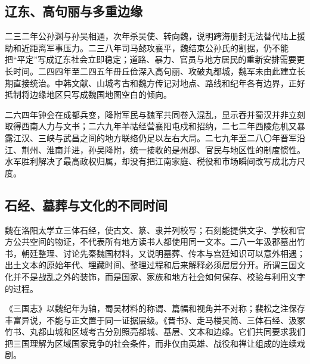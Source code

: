 \subsection{辽东、高句丽与多重边缘}

二三二年公孙渊与孙吴相通，次年杀吴使、转向魏，说明跨海册封无法替代陆上援助和近距离军事压力。二三八年司马懿攻襄平，魏结束公孙氏的割据，仍不能把“平定”写成辽东社会立即稳定；道路、暴力、官员与地方居民的重新安排需要更长时间。二四四年至二四五年毌丘俭深入高句丽、攻破丸都城，魏军未由此建立长期直接统治。中韩文献、山城考古和魏方传记对地点、路线和纪年各有边界，正好抵制将边缘地区只写成魏国地图空白的倾向。

二六四年钟会在成都兵变，降附军民与魏军共同卷入混乱，显示吞并蜀汉并非立刻取得西南人力与文书；二六九年羊祜经营襄阳屯戍和招纳，二七二年西陵危机又暴露江汉、三峡与武昌之间的地方联络仍足以左右大局。二七九年至二八〇年晋军沿江、荆州、淮南并进，孙吴降附，统一接收的是州郡、官民与地区性的制度惯性。水军胜利解决了最高政权归属，却没有把江南家庭、税役和市场瞬间改写成北方尺度。

\subsection{石经、墓葬与文化的不同时间}

魏在洛阳太学立三体石经，使古文、篆、隶并列校写；石刻能提供文字、学校和官方公共空间的物证，不代表所有地方读书人都使用同一文本。二八一年汲郡墓出竹书，朝廷整理、讨论先秦魏国材料，又说明墓葬、传本与宫廷知识可以意外相遇；出土文本的原始年代、埋藏时间、整理过程和后来解释必须层层分开。所谓三国文化并不是战乱之外的装饰，而是国家、家族和地方社会如何保存、校验与利用文字的过程。

《三国志》以魏纪年为轴，蜀吴材料的称谓、篇幅和视角并不对称；裴松之注保存丰富异说，不能与正文置于同一证据层级。《晋书》、走马楼吴简、三体石经、汲冢竹书、丸都山城和区域考古分别照亮都城、基层、文本和边缘。它们共同要求我们把三国理解为区域国家竞争的社会条件，而非仅由英雄、战役和禅让组成的连续戏剧。
